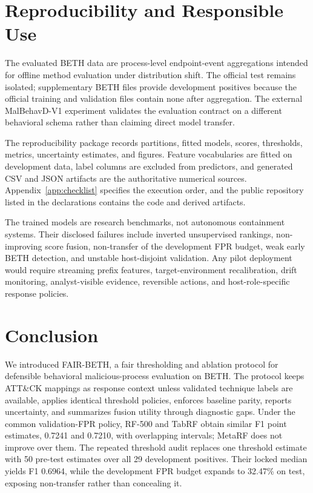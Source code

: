\documentclass[10pt,journal,compsoc]{IEEEtran}
\begin{document}
\section{Reproducibility and Responsible Use}
\label{sec:responsible}

The evaluated BETH data are process-level endpoint-event aggregations intended for offline method evaluation under distribution shift. The official test remains isolated; supplementary BETH files provide development positives because the official training and validation files contain none after aggregation. The external MalBehavD-V1 experiment validates the evaluation contract on a different behavioral schema rather than claiming direct model transfer.

The reproducibility package records partitions, fitted models, scores, thresholds, metrics, uncertainty estimates, and figures. Feature vocabularies are fitted on development data, label columns are excluded from predictors, and generated CSV and JSON artifacts are the authoritative numerical sources. Appendix~\ref{app:checklist} specifies the execution order, and the public repository listed in the declarations contains the code and derived artifacts.

The trained models are research benchmarks, not autonomous containment systems. Their disclosed failures include inverted unsupervised rankings, non-improving score fusion, non-transfer of the development FPR budget, weak early BETH detection, and unstable host-disjoint validation. Any pilot deployment would require streaming prefix features, target-environment recalibration, drift monitoring, analyst-visible evidence, reversible actions, and host-role-specific response policies.

\section{Conclusion}
\label{sec:conclusion}

We introduced FAIR-BETH, a fair thresholding and ablation protocol for defensible behavioral malicious-process evaluation on BETH. The protocol keeps ATT\&CK mappings as response context unless validated technique labels are available, applies identical threshold policies, enforces baseline parity, reports uncertainty, and summarizes fusion utility through diagnostic gaps. Under the common validation-FPR policy, RF-500 and TabRF obtain similar F1 point estimates, 0.7241 and 0.7210, with overlapping intervals; MetaRF does not improve over them. The repeated threshold audit replaces one threshold estimate with 50 pre-test estimates over all 29 development positives. Their locked median yields F1 0.6964, while the development FPR budget expands to 32.47\% on test, exposing non-transfer rather than concealing it.
\end{document}
